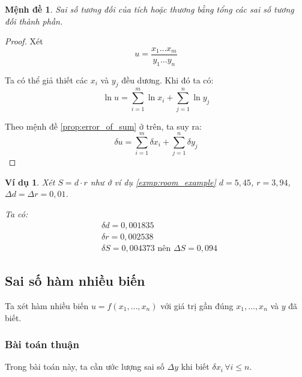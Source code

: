 \documentclass{book}    %
\newtheorem{exmp}{Ví dụ}[chapter]
\newtheorem*{proposition}{Mệnh đề}
\begin{document}
\begin{proposition}
    Sai số tương đối của tích hoặc thương bằng tổng các sai số tương đối thành
    phần.
\end{proposition}
\begin{proof}
    Xét
    \begin{equation*}
        u = \frac{x_1 \ldots x_m}{y_1 \ldots y_n}
    \end{equation*}

    Ta có thể giả thiết các \(x_i\) và \(y_j\) đều dương. Khi đó ta có:
    \begin{equation*}
        \ln{u} = \sum_{i=1}^{m} \ln{x_i} + \sum_{j=1}^{n} \ln{y_j}
    \end{equation*}

    Theo mệnh đề \ref{prop:error_of_sum} ở trên, ta suy ra:
    \begin{equation*}
        \delta u = \sum_{i=1}^{m} \delta x_i + \sum_{j=1}^{n} \delta y_j
    \end{equation*}
\end{proof}

\begin{exmp}
    Xét \(S = d \cdot r\) như ở ví dụ \ref{exmp:room_example} \(d = 5,45\), \(r
    = 3,94\), \(\Delta d = \Delta r = 0,01\).

    Ta có:
    \begin{equation*}
        \begin{aligned}
            &\delta d = 0,001835 \\
            &\delta r = 0,002538 \\
            &\delta S = 0,004373 \text{ nên } \Delta S = 0,094
        \end{aligned}
    \end{equation*}
\end{exmp}

\subsection{Sai số hàm nhiều biến}

Ta xét hàm nhiều biến \(u = f(x_1, \ldots, x_n)\) với giá trị gần đúng \(x_1,
\ldots, x_n\) và \(y\) đã biết.

\subsubsection{Bài toán thuận}

Trong bài toán này, ta cần ước lượng sai số \(\Delta y\) khi biết \(\delta x_i
\, \forall i \leq n\).    %
\end{document}
